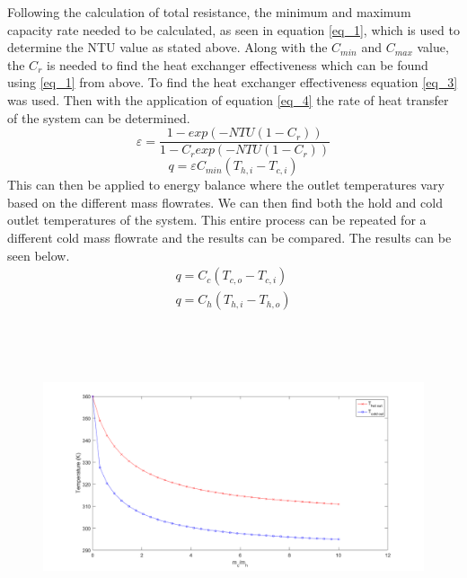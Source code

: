 %
Following the calculation of total resistance, the minimum and maximum capacity rate needed to be calculated, as seen in equation \eqref{eq_1}, which is used to determine the NTU value as stated above. Along with the $C_{min}$ and $C_{max}$ value, the $C_{r}$ is needed to find the heat exchanger effectiveness which can be found using \eqref{eq_1} from above. To find the heat exchanger effectiveness equation \eqref{eq_3} was used. Then with the application of equation \eqref{eq_4} the rate of heat transfer of the system can be determined.
%
\begin{equation} \label{eq_3}
\varepsilon =\frac { 1-exp\left( -NTU\left( 1-{ C }_{ r } \right)  \right)  }{ 1-{ C }_{ r }{ exp\left( -NTU\left( 1-{ C }_{ r } \right)  \right)  } } 
\end{equation}
%
\begin{equation} \label{eq_4}
 q=\varepsilon { C }_{ min }\left( { T }_{ h,i }-{ T }_{ c,i } \right) 
\end{equation}
This can then be applied to energy balance where the outlet temperatures vary based on the different mass flowrates. We can then find both the hold and cold outlet temperatures of the system. This entire process can be repeated for a different cold mass flowrate and the results can be compared. The results can be seen below.
%
\begin{subequations}
\begin{eqnarray}
 q={ C }_{ c }\left( { T }_{ c,o }-{ T }_{ c,i } \right)  \\
 q={ C }_{ h }\left( { T }_{ h,i }-{ T }_{ h,o } \right) 
\end{eqnarray}
\end{subequations}
%
\begin{figure}[H]
    \centering
    \includegraphics[height=3.5in]{pictures/part_1_temp_out.png}
\end{figure}
%